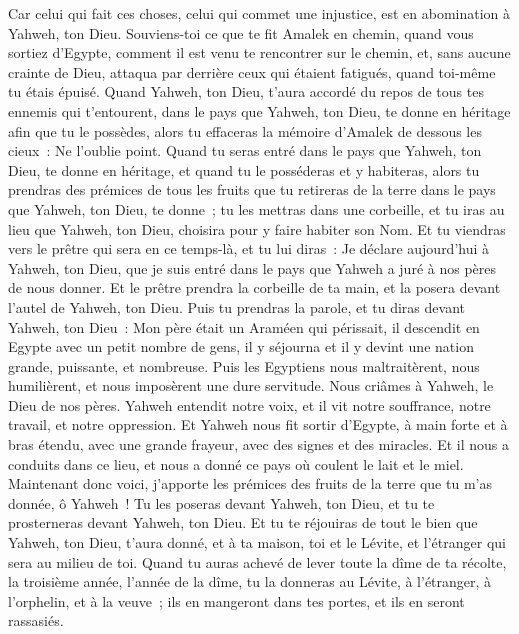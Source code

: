 \begin{multicols}{2}
Car celui qui fait ces choses, celui qui commet une injustice, est en abomination à Yahweh, ton Dieu.
Souviens-toi ce que te fit Amalek en chemin, quand vous sortiez d'Egypte,
comment il est venu te rencontrer sur le chemin, et, sans aucune crainte de Dieu, attaqua par derrière ceux qui étaient fatigués, quand toi-même tu étais épuisé.
Quand Yahweh, ton Dieu, t'aura accordé du repos de tous tes ennemis qui t'entourent, dans le pays que Yahweh, ton Dieu, te donne en héritage afin que tu le possèdes, alors tu effaceras la mémoire d'Amalek de dessous les cieux~: Ne l'oublie point.
\VerseOne{}Quand tu seras entré dans le pays que Yahweh, ton Dieu, te donne en héritage, et quand tu le posséderas et y habiteras,
alors tu prendras des prémices de tous les fruits que tu retireras de la terre dans le pays que Yahweh, ton Dieu, te donne~; tu les mettras dans une corbeille, et tu iras au lieu que Yahweh, ton Dieu, choisira pour y faire habiter son Nom.
Et tu viendras vers le prêtre qui sera en ce temps-là, et tu lui diras~: Je déclare aujourd'hui à Yahweh, ton Dieu, que je suis entré dans le pays que Yahweh a juré à nos pères de nous donner.
Et le prêtre prendra la corbeille de ta main, et la posera devant l'autel de Yahweh, ton Dieu.
Puis tu prendras la parole, et tu diras devant Yahweh, ton Dieu~: Mon père était un Araméen qui périssait, il descendit en Egypte avec un petit nombre de gens, il y séjourna et il y devint une nation grande, puissante, et nombreuse.
Puis les Egyptiens nous maltraitèrent, nous humilièrent, et nous imposèrent une dure servitude.
Nous criâmes à Yahweh, le Dieu de nos pères. Yahweh entendit notre voix, et il vit notre souffrance, notre travail, et notre oppression.
Et Yahweh nous fit sortir d'Egypte, à main forte et à bras étendu, avec une grande frayeur, avec des signes et des miracles.
Et il nous a conduits dans ce lieu, et nous a donné ce pays où coulent le lait et le miel.
Maintenant donc voici, j'apporte les prémices des fruits de la terre que tu m'as donnée, ô Yahweh~! Tu les poseras devant Yahweh, ton Dieu, et tu te prosterneras devant Yahweh, ton Dieu.
Et tu te réjouiras de tout le bien que Yahweh, ton Dieu, t'aura donné, et à ta maison, toi et le Lévite, et l'étranger qui sera au milieu de toi.
Quand tu auras achevé de lever toute la dîme de ta récolte, la troisième année, l'année de la dîme, tu la donneras au Lévite, à l'étranger, à l'orphelin, et à la veuve~; ils en mangeront dans tes portes, et ils en seront rassasiés.

\end{multicols}
